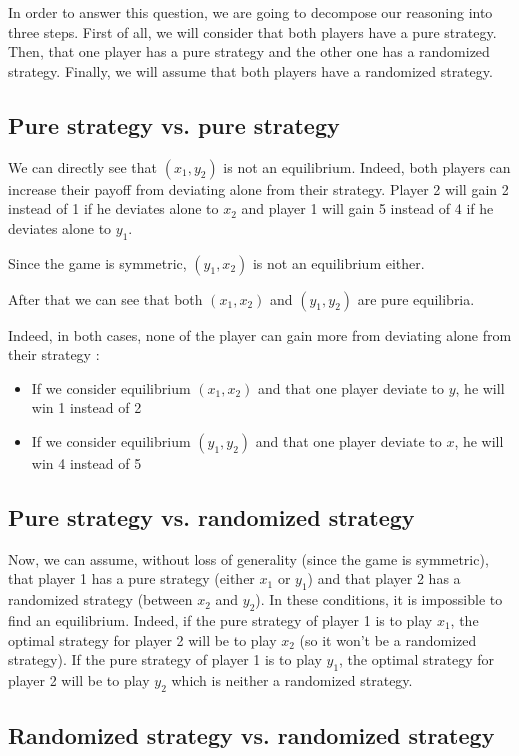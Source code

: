 In order to answer this question, we are going to decompose our reasoning into three steps.
First of all, we will consider that both players have a pure strategy. Then, that one player has a pure strategy and the other one has a randomized strategy. Finally, we will assume that both players have a randomized strategy.

\subsection*{Pure strategy vs. pure strategy}

We can directly see that $(x_1, y_2)$ is not an equilibrium. Indeed, both players can increase their payoff from deviating alone from their strategy. Player 2 will gain 2 instead of 1 if he deviates alone to $x_2$ and player 1 will gain 5 instead of 4 if he deviates alone to $y_1$.

Since the game is symmetric, $(y_1, x_2)$ is not an equilibrium either.

After that we can see that both $(x_1, x_2)$ and $(y_1, y_2)$ are pure equilibria.

Indeed, in both cases, none of the player can gain more from deviating alone from their strategy :
\begin{itemize}
	\item If we consider equilibrium $(x_1, x_2)$ and that one player deviate to $y$, he will win 1 instead of 2
	\item If we consider equilibrium $(y_1, y_2)$ and that one player deviate to $x$, he will win 4 instead of 5
\end{itemize}

\subsection*{Pure strategy vs. randomized strategy}

Now, we can assume, without loss of generality (since the game is symmetric), that player 1 has a pure strategy (either $x_1$ or $y_1$) and that player 2 has a randomized strategy (between $x_2$ and $y_2$). In these conditions, it is impossible to find an equilibrium. Indeed, if the pure strategy of player 1 is to play $x_1$, the optimal strategy for player 2 will be to play $x_2$ (so it won't be a randomized strategy). If the pure strategy of player 1 is to play $y_1$, the optimal strategy for player 2 will be to play $y_2$ which is neither a randomized strategy.

\subsection*{Randomized strategy vs. randomized strategy}

